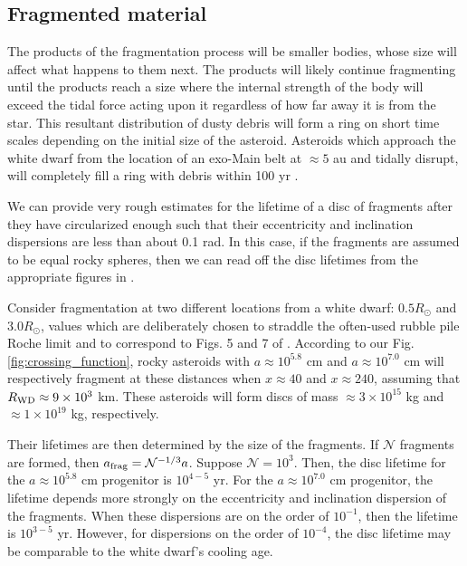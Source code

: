 \documentclass[fleqn,usenatbib]{mnras}
\begin{document}
\subsection{Fragmented material} \label{subsec:fragmented}
The products of the fragmentation process will be smaller bodies, whose size will affect what happens to them next.
The products will likely continue fragmenting until the products reach a size where the internal strength of the body will exceed the tidal force acting upon it regardless of how far away it is from the star. 
This resultant distribution of dusty debris will form a ring on short time scales depending on the initial size of the asteroid.
Asteroids which approach the white dwarf from the location of an exo-Main belt at $\approx 5$ au and tidally disrupt, will completely fill a ring with debris within 100 yr \citep{Veras2014a}.

We can provide very rough estimates for the lifetime of a disc of fragments after they have circularized enough \citep{Veras2015b, Nixon2020, Malamud2021} such that their eccentricity and inclination dispersions are less than about 0.1 rad. In this case, if the fragments are assumed to be equal rocky spheres, then we can read off the disc lifetimes from the appropriate figures in \cite{Veras2020d}.


Consider fragmentation at two different locations from a white dwarf: $0.5R_{\odot}$ and $3.0R_{\odot}$, values which are deliberately chosen to straddle the often-used rubble pile Roche limit and to correspond to Figs. 5 and 7 of \cite{Veras2020d}. According to our Fig. \ref{fig:crossing_function}, rocky asteroids with $a \approx 10^{5.8}$ cm and $a \approx 10^{7.0}$ cm will respectively fragment at these distances when $x \approx 40$ and $x \approx 240$, assuming that $R_{\rm WD} \approx 9\times 10^3$ km. These asteroids will form discs of mass $\approx 3 \times 10^{15}$ kg and $\approx 1 \times 10^{19}$ kg, respectively.


Their lifetimes are then determined by the size of the fragments. If $\mathcal{N}$ fragments are formed, then $a_{\rm frag} = \mathcal{N}^{-1/3}a$. Suppose $\mathcal{N} = 10^3$. Then, the disc lifetime for the $a \approx 10^{5.8}$ cm progenitor is $10^{4-5}$ yr. For the $a \approx 10^{7.0}$ cm progenitor, the lifetime depends more strongly on the eccentricity and inclination dispersion of the fragments. When these dispersions are on the order of $10^{-1}$, then the lifetime is $10^{3-5}$ yr. However, for dispersions on the order of $10^{-4}$, the disc lifetime may be comparable to the white dwarf's cooling age.
\end{document}

